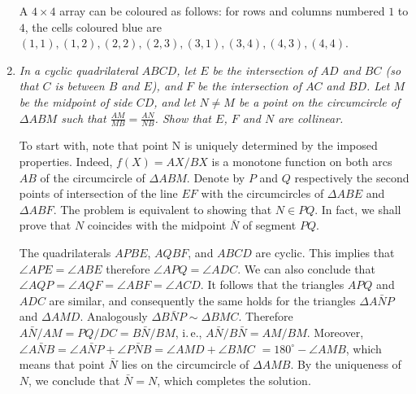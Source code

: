 \documentclass[a4paper,12pt]{article}
\begin{document}
\begin{enumerate}
	A $4\times 4$ array can be coloured as follows: for rows and columns numbered $1$ to $4$, the cells coloured blue are $(1,1),(1,2),(2,2),(2,3),(3,1),(3,4),(4,3),(4,4)$.
	
	\item %
	\textit{In a cyclic quadrilateral $ABCD$, let $E$ be the intersection of $AD$ and $BC$ (so that $C$ is between $B$ and $E$), and $F$ be the intersection of $AC$ and $BD$. Let $M$ be the midpoint of side $CD$, and let $N\neq M$ be a point on the circumcircle of $\Delta ABM$ such that $\frac{AM}{MB}=\frac{AN}{NB}$. Show that $E$, $F$ and $N$ are collinear.}
	
	To start with, note that point N is uniquely determined by the imposed properties. Indeed, $f(X) = AX/BX$ is a monotone function on both arcs $AB$ of the circumcircle of $\Delta ABM$. Denote by $P$ and $Q$ respectively the second points of intersection of the line $EF$ with the circumcircles of $\Delta ABE$ and $\Delta ABF$. The problem is equivalent to showing that $N \in PQ$. In fact, we shall prove that $N$ coincides with the midpoint $\bar{N}$ of segment $PQ$.
	
	
	The quadrilaterals $APBE$, $AQBF$, and $ABCD$ are cyclic. This implies that $\angle APE = \angle ABE$ therefore $\angle APQ = \angle ADC$. We can also conclude that $\angle AQP = \angle AQF = \angle ABF = \angle ACD$. It follows that the triangles $APQ$ and $ADC$ are similar, and consequently the same holds for the triangles $\Delta A\bar{N}P$ and $\Delta AMD$. Analogously $\Delta B\bar{N}P ∼ \Delta BMC$. Therefore $A\bar{N}/AM = PQ/DC = B\bar{N}/BM$, i.\,e., $A\bar{N}/B\bar{N} = AM/BM$. Moreover, $\angle A\bar{N}B = \angle A\bar{N}P + \angle P\bar{N}B = \angle AMD + \angle BMC$ $= 180^\circ - \angle AMB$, which means that point $\bar{N}$ lies on the circumcircle of $\Delta AMB$. By
the uniqueness of $N$, we conclude that $\bar{N} = N$, which completes the solution.

\end{enumerate}
\end{document}
